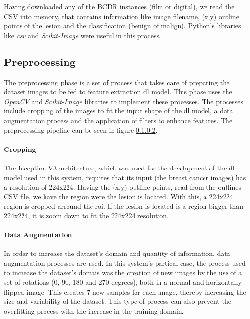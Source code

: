 \documentclass[
  twoside,
  11pt, a4paper,
  footinclude=true,
  headinclude=true,
  cleardoublepage=empty
]{scrbook}
\begin{document}

        Having downloaded any of the BCDR instances (film or digital), we read the CSV into memory, that contains information like image filename, (x,y) outline points of the lesion and the classification (benign of malign). Python's libraries like \textit{csv} and \textit{Scikit-Image} were useful in this process.

      \subsection{Preprocessing}
        The preprocessing phase is a set of process that takes care of preparing the dataset images to be fed to feature extraction \gls{dl} model. This phase uses the \textit{OpenCV} and \textit{Scikit-Image} libraries to implement these processes. The processes include cropping of the images to fit the input shape of the \gls{dl} model, a data augmentation process and the application of filters to enhance features. The preprocessing pipeline can be seen in figure \ref{}.

        \paragraph{Cropping}
          The Inception V3 architecture, which was used for the development of the \gls{dl} model used in this system, requires that its input (the breast cancer images) has a resolution of 224x224. Having the (x,y) outline points, read from the outlines CSV file, we have the region were the lesion is located. With this, a 224x224 region is cropped arround the \gls{roi}. If the lesion is located is a region bigger than 224x224, it is zoom down to fit the 224x224 resolution.

        \paragraph{Data Augmentation}
          In order to increase the dataset's domain and quantity of information, data augmentation processes are used. In this system's partical case, the process used to increase the dataset's domais was the creation of new images by the use of a set of rotations (0, 90, 180 and 270 degrees), both in a normal and horizontally flipped image. This creates 7 new samples for each image, thereby increasing the size and variability of the dataset. This type of process can also prevent the overfitting process with the increase in the training domain.
\end{document}
